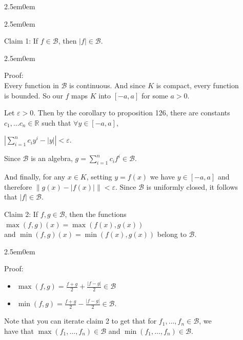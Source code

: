 \documentclass{book}
\newcommand{\hFour}{%
   \color{Cerulean}
   \fontsize{12}{14}\selectfont%
}
\newenvironment{myIndent}{%
   \begin{adjustwidth}{2.5em}{0em}%
}{%
   \end{adjustwidth}%
}
\newcommand{\retTwo}{\hfill\bigbreak}
\begin{document}
{\begin{myIndent}
{\begin{myIndent}
      Claim 1: If $f \in \mathscr{B}$, then $|f| \in \mathscr{B}$.
      {\begin{myIndent}\hFour
         Proof:\\
         Every function in $\mathscr{B}$ is continuous. And since $K$ is compact, every function\\ is bounded. So our $f$ maps $K$ into $[-a, a]$ for some $a > 0$.

         \newpage

         Let $\varepsilon > 0$. Then by the corollary to proposition 126, there are constants\\ $c_1, \ldots c_n \in \mathbb{R}$ such that $\forall y \in [-a, a]$,
         
         {\center $\left|\sum\limits_{i=1}^n c_iy^i - |y|\right| < \varepsilon$.\retTwo\par}

         Since $\mathscr{B}$ is an algebra, $g = \sum\limits_{i=1}^n c_if^i \in \mathscr{B}$.\retTwo

         And finally, for any $x \in K$, setting $y = f(x)$ we have $y \in [-a, a]$ and\\ therefore $\|g(x) - |f(x)|\| < \varepsilon$. Since $\mathscr{B}$ is uniformly closed, it follows\\ that $|f| \in \mathscr{B}$.\retTwo
      \end{myIndent}}

      Claim 2: If $f, g \in \mathscr{B}$, then the functions $\max(f, g)(x) = \max(f(x), g(x))$\\ and $\min(f, g)(x) = \min(f(x), g(x))$ belong to $\mathscr{B}$.

      {\begin{myIndent}\hFour
         Proof:
         \begin{itemize}
            \item $\max(f, g) = \frac{f + g}{2} + \frac{|f - g|}{2} \in \mathscr{B}$
            \item $\min(f, g) = \frac{f + g}{2} - \frac{|f - g|}{2} \in \mathscr{B}$.\\
         \end{itemize}
      \end{myIndent}}

      Note that you can iterate claim 2 to get that for $f_1, \ldots, f_n \in \mathscr{B}$, we\\ have that $\max(f_1, \ldots, f_n) \in \mathscr{B}$ and $\min(f_1, \ldots, f_n) \in \mathscr{B}$.\retTwo


\end{myIndent}}
\end{myIndent}}
\end{document}
